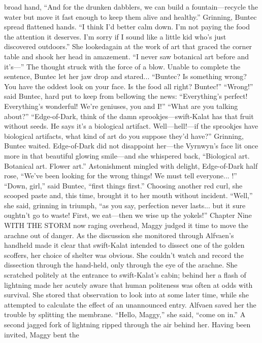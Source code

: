 \documentclass[9pt]{article}
\begin{document}
broad hand, “And for the drunken dabblers, we can build a fountain—recycle the water but move it fast
enough to keep them alive and healthy.”
Grinning, Buntec spread flattened hands. “I think I’d better calm down. I’m not paying the food the
attention it deserves. I’m sorry if I sound like a little kid who’s just discovered outdoors.” She lookedagain at the work of art that graced the corner table and shook her head in amazement. “I never saw
botanical art before and it’s—” The thought struck with the force of a blow. Unable to complete the
sentence, Buntec let her jaw drop and stared...
“Buntec? Is something wrong? You have the oddest look on your face. Is the food all right? Buntec!”
“Wrong!” said Buntec, hard put to keep from bellowing the news: “Everything’s perfect!
Everything’s wonderful! We’re geniuses, you and I!”
“What are you talking about?”
“Edge-of-Dark, think of the damn sprookjes—swift-Kalat has that fruit without seeds. He says it’s a
biological artifact. Well—hell!—if the sprookjes have biological artifacts, what kind of art do you
suppose they’d have?”
Grinning, Buntec waited. Edge-of-Dark did not disappoint her—the Vyrnwyn’s face lit once more in
that beautiful glowing smile—and she whispered back, “Biological art. Botanical art. Flower art.”
Astonishment mingled with delight, Edge-of-Dark half rose, “We’ve been looking for the wrong things!
We must tell everyone... !”
“Down, girl,” said Buntec, “first things first.” Choosing another red curl, she scooped paste and, this
time, brought it to her mouth without incident. “Well,” she said, grinning in triumph, “as you say,
perfection never lasts... but it sure oughtn’t go to waste! First, we eat—then we wise up the yokels!”
Chapter Nine
WITH THE STORM now raging overhead, Maggy judged it time to move the arachne out of
danger. As the discussion she monitored through Alfvaen’s handheld made it clear that swift-Kalat
intended to dissect one of the golden scoffers, her choice of shelter was obvious. She couldn’t watch and
record the dissection through the hand-held, only through the eye of the arachne.
She scratched politely at the entrance to swift-Kalat’s cabin; behind her a flash of lightning made her
acutely aware that human politeness was often at odds with survival. She stored that observation to look
into at some later time, while she attempted to calculate the effect of an unannounced entry.
Alfvaen saved her the trouble by splitting the membrane. “Hello, Maggy,” she said, “come on in.” A
second jagged fork of lightning ripped through the air behind her. Having been invited, Maggy bent the
\end{document}
